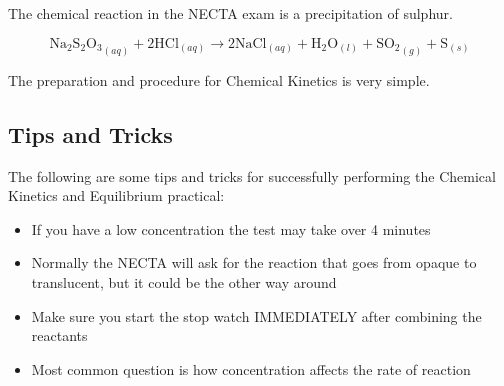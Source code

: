 The chemical reaction in the NECTA exam is a precipitation of sulphur. 

\[ \mathrm{Na_2S_2O_3}_{(aq)} + \mathrm{2HCl}_{(aq)} \longrightarrow \mathrm{2NaCl}_{(aq)} + \mathrm{H}_{2}\mathrm{O}_{(l)} + \mathrm{SO_2}_{(g)} + \mathrm{S}_{(s)} \]

The preparation and procedure for Chemical Kinetics is very simple.

\subsection{Tips and Tricks}

\noindent The following are some tips and tricks for successfully performing the Chemical Kinetics and Equilibrium practical: 
\begin{itemize}[topsep=0ex,itemsep=0ex,partopsep=1ex,parsep=1ex]
	\item If you have a low concentration the test may take over 4 minutes
	\item Normally the NECTA will ask for the reaction that goes from opaque to translucent, but it could be the other way around
	\item Make sure you start the stop watch IMMEDIATELY after combining the reactants
	\item Most common question is how concentration affects the rate of reaction
\end{itemize}


